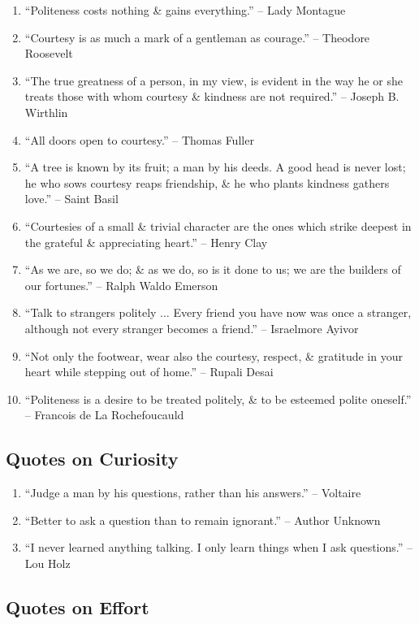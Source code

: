 \documentclass{article}
\begin{document}
\begin{enumerate}
	\item ``Politeness costs nothing \& gains everything.'' -- Lady Montague
	\item ``Courtesy is as much a mark of a gentleman as courage.'' -- Theodore Roosevelt
	\item ``The true greatness of a person, in my view, is evident in the way he or she treats those with whom courtesy \& kindness are not required.'' -- Joseph B. Wirthlin
	\item ``All doors open to courtesy.'' -- Thomas Fuller
	\item ``A tree is known by its fruit; a man by his deeds. A good head is never lost; he who sows courtesy reaps friendship, \& he who plants kindness gathers love.'' -- Saint Basil
	\item ``Courtesies of a small \& trivial character are the ones which strike deepest in the grateful \& appreciating heart.'' -- Henry Clay
	\item ``As we are, so we do; \& as we do, so is it done to us; we are the builders of our fortunes.'' -- Ralph Waldo Emerson
	\item ``Talk to strangers politely $\ldots$ Every friend you have now was once a stranger, although not every stranger becomes a friend.'' -- Israelmore Ayivor
	\item ``Not only the footwear, wear also the courtesy, respect, \& gratitude in your heart while stepping out of home.'' -- Rupali Desai
	\item ``Politeness is a desire to be treated politely, \& to be esteemed polite oneself.'' -- Francois de La Rochefoucauld
\end{enumerate}

\subsection{Quotes on Curiosity}

\begin{enumerate}
	\item ``Judge a man by his questions, rather than his answers.'' -- Voltaire
	\item ``Better to ask a question than to remain ignorant.'' -- Author Unknown
	\item ``I never learned anything talking. I only learn things when I ask questions.'' -- Lou Holz
\end{enumerate}

\subsection{Quotes on Effort}
\end{document}
